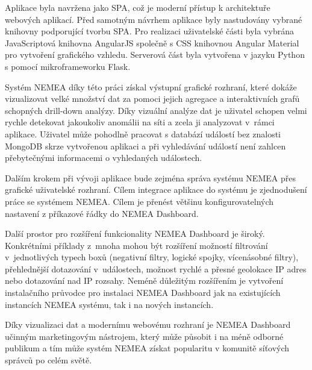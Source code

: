 Aplikace byla navržena jako SPA, což je moderní přístup k architektuře webových aplikací. Před samotným návrhem aplikace byly nastudovány vybrané knihovny podporující tvorbu SPA. Pro realizaci uživatelské části byla vybrána JavaScriptová knihovna AngularJS společně s CSS knihovnou Angular Material pro vytvoření grafického vzhledu. Serverová část byla vytvořena v jazyku Python s pomocí mikroframeworku Flask.

Systém NEMEA díky této práci získal výstupní grafické rozhraní, které dokáže vizualizovat velké množství dat za pomoci jejich agregace a interaktivních grafů schopných drill-down analýzy. Díky vizuální analýze dat je uživatel schopen velmi rychle detekovat jakoukoliv anomálii na síti a zcela ji analyzovat v~rámci aplikace. Uživatel může pohodlně pracovat s databází událostí bez znalosti MongoDB skrze vytvořenou aplikaci a při vyhledávání událostí není zahlcen přebytečnými informacemi o vyhledaných událostech.

Dalším krokem při vývoji aplikace bude zejména správa systému NEMEA přes grafické uživatelské rozhraní. Cílem integrace aplikace do systému je zjednodušení práce se systémem NEMEA. Cílem je přenést většinu konfigurovatelných nastavení z příkazové řádky do NEMEA Dashboard.

Další prostor pro rozšíření funkcionality NEMEA Dashboard je široký. Konkrétními příklady z~mnoha mohou být rozšíření možností filtrování v~jednotlivých typech boxů (negativní filtry, logické spojky, vícenásobné filtry), přehlednější dotazování v~událostech, možnost rychlé a přesné geolokace IP adres nebo dotazování nad IP rozsahy. Neméně důležitým rozšířením je vytvoření instalačního průvodce pro instalaci NEMEA Dashboard jak na existujících instancích NEMEA systému, tak i na nových instancích.

Díky vizualizaci dat a modernímu webovému rozhraní je NEMEA Dashboard učinným marketingovým nástrojem, který může působit i na méně odborné publikum a tím může systém NEMEA získat popularitu v komunitě síťových správců po celém světě.
